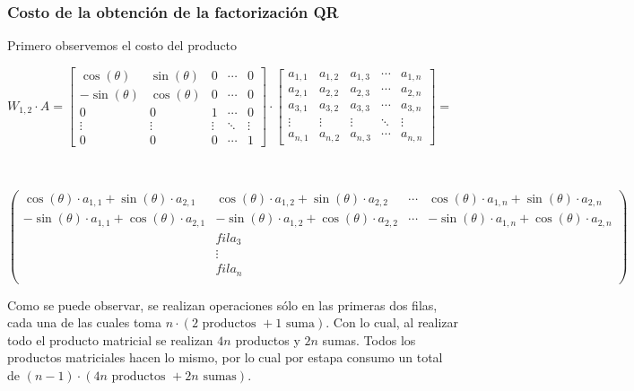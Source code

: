 \documentclass[]{article}
\begin{document}

\subsubsection{Costo de la obtención de la factorización QR}
Primero observemos el costo del producto
\begin{center}
	$W_{1,2}\cdot A = \begin{bmatrix}
		\cos(\theta)&\sin(\theta)&0&\cdots&0\\
		-\sin(\theta)&\cos(\theta)&0&\cdots&0\\
		0&0&1&\cdots&0\\
		\vdots&\vdots&\vdots&\ddots&\vdots\\
		0&0&0&\cdots&1
	\end{bmatrix}\cdot \begin{bmatrix}
		a_{1,1}&a_{1,2}&a_{1,3}&\cdots&a_{1,n}\\
		a_{2,1}&a_{2,2}&a_{2,3}&\cdots&a_{2,n}\\
		a_{3,1}&a_{3,2}&a_{3,3}&\cdots&a_{3,n}\\
		\vdots&\vdots&\vdots&\ddots&\vdots\\
		a_{n,1}&a_{n,2}&a_{n,3}&\cdots&a_{n,n}
	\end{bmatrix} =$

	~\newline

	$
	\begin{pmatrix}
		\cos(\theta)\cdot a_{1,1}+\sin(\theta)\cdot a_{2,1} & \cos(\theta)\cdot a_{1,2}+\sin(\theta)\cdot a_{2,2} & \cdots & \cos(\theta)\cdot a_{1,n}+\sin(\theta)\cdot a_{2,n}\\
		-\sin(\theta)\cdot a_{1,1}+\cos(\theta)\cdot a_{2,1} & -\sin(\theta)\cdot a_{1,2}+\cos(\theta)\cdot a_{2,2} & \cdots & -\sin(\theta)\cdot a_{1,n}+\cos(\theta)\cdot a_{2,n}\\
		&fila_3&&\\
		&\vdots&&\\
		&fila_n&&\\
	\end{pmatrix}$
\end{center}

Como se puede observar, se realizan operaciones sólo en las primeras dos filas, cada una de las cuales toma $n\cdot(2\text{ productos } + 1 \text{ suma})$. Con lo cual, al realizar todo el producto matricial se realizan $4n$ productos y $2n$ sumas. Todos los productos matriciales hacen lo mismo, por lo cual por estapa consumo un total de $(n-1)\cdot(4n \text{ productos } + 2n \text{ sumas})$.
\end{document}
